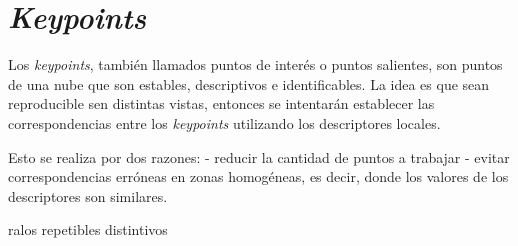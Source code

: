 \section{\emph{Keypoints}}
Los \emph{keypoints}, también llamados puntos de interés o puntos salientes, son puntos de una nube que son
estables,
descriptivos
e identificables.
La idea es que sean reproducible sen distintas vistas, entonces se intentarán establecer las correspondencias entre los \emph{keypoints} utilizando los descriptores locales.

Esto se realiza por dos razones:
- reducir la cantidad de puntos a trabajar
- evitar correspondencias erróneas en zonas homogéneas, es decir, donde los
valores de los descriptores son similares.


ralos
repetibles
distintivos


